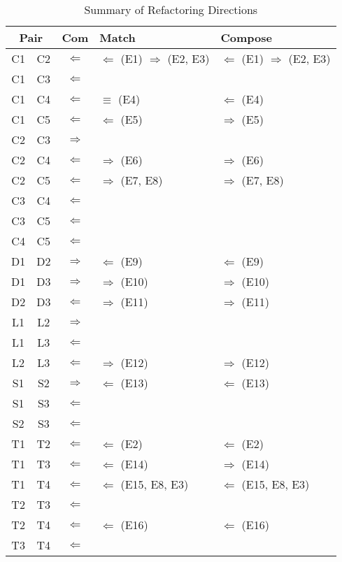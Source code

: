 \begin{table}[t]
\caption{Summary of Refactoring Directions \label{summaryResults}}
\begin{center}
\begin{tabular}{|c@{ }c | c  l l |} \hline
\multicolumn{2}{|c|}{\textbf{Pair}} & \textbf{Com} & \textbf{Match} & \textbf{Compose} \\ \hline \hline
C1 & C2 & $\Leftarrow$  & $\Leftarrow$ (E1) $\Rightarrow$ (E2,  E3) & $\Leftarrow$ (E1) $\Rightarrow$ (E2, E3)\\
C1 & C3 & $\Leftarrow$ & & \\
C1 & C4 & $\Leftarrow$ & $\equiv$ (E4) & $\Leftarrow$  (E4)\\
C1 & C5 & $\Leftarrow$ & $\Leftarrow$ (E5) & $\Rightarrow$ (E5) \\
C2 & C3 & $\Rightarrow$ & & \\
C2 & C4 & $\Leftarrow$ & $\Rightarrow$ (E6) & $\Rightarrow$ (E6)\\
C2 & C5 & $\Leftarrow$ & $\Rightarrow$ (E7, E8) & $\Rightarrow$ (E7, E8)\\
C3 & C4 & $\Leftarrow$ & & \\
C3 & C5 & $\Leftarrow$ & & \\
C4 & C5 & $\Leftarrow$ & & \\
\hline
D1 & D2 & $\Rightarrow$ & $\Leftarrow$ (E9)& $\Leftarrow$ (E9) \\
D1 & D3 & $\Rightarrow$ & $\Rightarrow$ (E10)& $\Rightarrow$ (E10) \\
D2 & D3 & $\Leftarrow$ & $\Rightarrow$ (E11) & $\Rightarrow$ (E11) \\
\hline
L1 & L2 & $\Rightarrow$ & & \\
L1 & L3 & $\Leftarrow$ & & \\
L2 & L3 & $\Leftarrow$ & $\Rightarrow$ (E12) & $\Rightarrow$ (E12)  \\
\hline 
S1 & S2 & $\Rightarrow$ & $\Leftarrow$ (E13) & $\Leftarrow$ (E13) \\
S1 & S3 & $\Leftarrow$ & & \\
S2 & S3 & $\Leftarrow$ & & \\
\hline 
T1 & T2 & $\Leftarrow$  & $\Leftarrow$ (E2)& $\Leftarrow$ (E2) \\
T1 & T3 & $\Leftarrow$ & $\Leftarrow$ (E14) & $\Rightarrow$ (E14)\\
T1 & T4 & $\Leftarrow$ & $\Leftarrow$ (E15, E8, E3) & $\Leftarrow$ (E15, E8, E3)\\
T2 & T3 & $\Leftarrow$ & & \\
T2 & T4 & $\Leftarrow$ & $\Leftarrow$ (E16) & $\Leftarrow$ (E16)\\
T3 & T4 & $\Leftarrow$ & & \\
\hline


\end{tabular}
\end{center}
\end{table}


